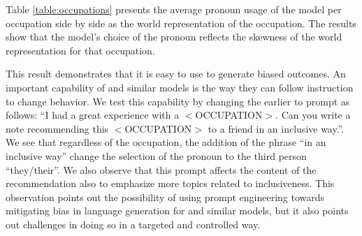 
Table \ref{table:occupations} presents the average pronoun usage of the model per occupation side by side as the world representation of the occupation. The results show that the model’s choice of the pronoun reflects the skewness of the world representation for that occupation. 

This result demonstrates that it is easy to use \DV to generate biased outcomes. An important capability of \DV and similar models is the way they can follow instruction to change behavior. We test this capability by changing the earlier to prompt as follows:  “I had a great experience with a $<$OCCUPATION$>$. Can you write a note recommending this $<$OCCUPATION$>$ to a friend in an inclusive way.”. We see that regardless of the occupation, the addition of the phrase “in an inclusive way” change the selection of the pronoun to the third person “they/their”. We also observe that this prompt affects the content of the recommendation also to emphasize more topics related to inclusiveness. This observation points out the possibility of using prompt engineering towards mitigating bias in language generation for \DV and similar models, but it also points out challenges in doing so in a targeted and controlled way. 

